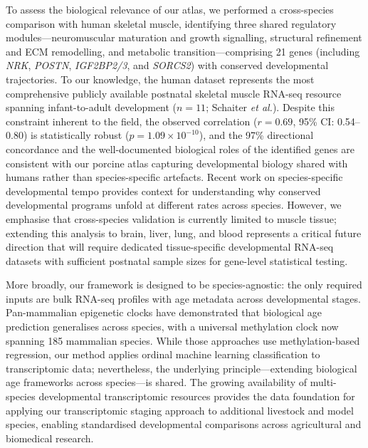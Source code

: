 \documentclass[10pt,a4paper]{article}
\begin{document}
To assess the biological relevance of our atlas, we performed a cross-species comparison with human skeletal muscle, identifying three shared regulatory modules---neuromuscular maturation and growth signalling, structural refinement and ECM remodelling, and metabolic transition---comprising 21 genes (including \textit{NRK}, \textit{POSTN}, \textit{IGF2BP2/3}, and \textit{SORCS2}) with conserved developmental trajectories. To our knowledge, the human dataset represents the most comprehensive publicly available postnatal skeletal muscle RNA-seq resource spanning infant-to-adult development ($n = 11$; Schaiter \textit{et al.}\cite{schaiter_molecular_2024}). Despite this constraint inherent to the field, the observed correlation ($r = 0.69$, 95\% CI: 0.54--0.80) is statistically robust ($p = 1.09 \times 10^{-10}$), and the 97\% directional concordance and the well-documented biological roles of the identified genes are consistent with our porcine atlas capturing developmental biology shared with humans rather than species-specific artefacts. Recent work on species-specific developmental tempo provides context for understanding why conserved developmental programs unfold at different rates across species\cite{iwata_metabolic_2024}. However, we emphasise that cross-species validation is currently limited to muscle tissue; extending this analysis to brain, liver, lung, and blood represents a critical future direction that will require dedicated tissue-specific developmental RNA-seq datasets with sufficient postnatal sample sizes for gene-level statistical testing.

More broadly, our framework is designed to be species-agnostic: the only required inputs are bulk RNA-seq profiles with age metadata across developmental stages. Pan-mammalian epigenetic clocks have demonstrated that biological age prediction generalises across species, with a universal methylation clock now spanning 185 mammalian species\cite{lu_universal_2023,horvath_dna_2013,schachtschneider_epigenetic_2021}. While those approaches use methylation-based regression, our method applies ordinal machine learning classification to transcriptomic data; nevertheless, the underlying principle---extending biological age frameworks across species---is shared. The growing availability of multi-species developmental transcriptomic resources\cite{cardoso-moreira_gene_2019,coorens_human_2025} provides the data foundation for applying our transcriptomic staging approach to additional livestock and model species, enabling standardised developmental comparisons across agricultural and biomedical research.
\end{document}
